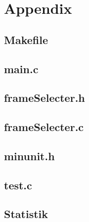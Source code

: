 \section{Appendix}

\subsection{Makefile}

\pagebreak

\subsection{main.c}

\pagebreak

\subsection{frameSelecter.h}

\pagebreak

\subsection{frameSelecter.c}

\pagebreak

\subsection{minunit.h}

\pagebreak

\subsection{test.c}
\label{app:test}

\pagebreak

\subsection{Statistik}


\pagebreak
